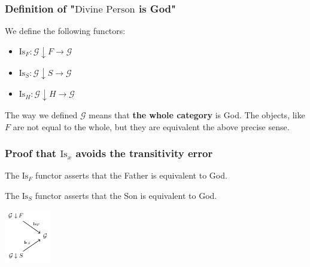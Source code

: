 \documentclass[11pt]{article}
\begin{document}
\subsubsection{Definition of "\(\text{Divine Person}\) is God"}
\label{sec:org02b50cd}

We define the following functors:

\begin{itemize}
\item \(\text{Is}_F : \mathcal{G}\downarrow F \to \mathcal{G}\)
\item \(\text{Is}_S : \mathcal{G}\downarrow S \to \mathcal{G}\)
\item \(\text{Is}_H : \mathcal{G}\downarrow H \to \mathcal{G}\)
\end{itemize}

The way we defined \(\mathcal{G}\) means that \textbf{the whole category} is God. The objects, like \(F\) are not
equal to the whole, but they are equivalent the above precise sense.
\subsubsection{Proof that \(\text{Is}_x\) avoids the transitivity error}
\label{sec:org4b2f95e}

The \(\text{Is}_F\) functor asserts that the Father is equivalent to God.

The \(\text{Is}_S\) functor asserts that the Son is equivalent to God.

\begin{center}
\includegraphics[width=.9\linewidth]{./no-transitive.png}
\end{center}
\end{document}
